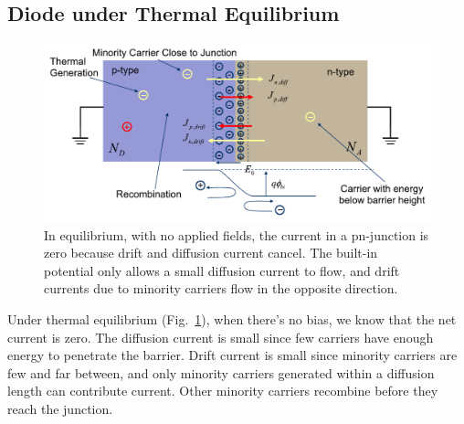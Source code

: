 \subsection{Diode under Thermal Equilibrium}
\begin{figure}[tb]
\begin{center}
\includegraphics[width=.75\columnwidth]{slide35}
\end{center}
\caption{In equilibrium, with no applied fields, the current in a pn-junction is zero because drift and diffusion current cancel.  The built-in potential only allows a small diffusion current to flow, and drift currents due to minority carriers flow in the opposite direction.} \label{fig:slide35}
\end{figure}

Under thermal equilibrium (Fig.~\ref{fig:slide35}), when there's no bias, we know that the net current is zero.  The diffusion current is small since few carriers have enough energy to penetrate the barrier.   Drift current is small since minority carriers are few and far between, and only minority carriers generated within a diffusion length can contribute current.  Other minority carriers recombine before they reach the junction.
